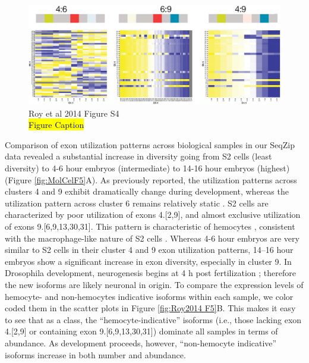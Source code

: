 {		\begin{figure}[htbp] %
		  \centering 
		  \includegraphics{Figures/SeqZipPaper/Roy2014FigS4.eps}
		  \caption[Roy et al 2014 Figure S4]
		  {Roy et al 2014 Figure S4 \\
		    \hl{Figure Caption}
		    }
		  \label{fig:Roy2014 FS4}
		  \end{figure}

		Comparison of exon utilization patterns across biological samples in our SeqZip data revealed a substantial increase in diversity going from S2 cells (least diversity) to 4-6 hour embryos (intermediate) to 14-16 hour embryos (highest) (Figure \ref{fig:MolCelF5}A). As previously reported, the utilization patterns across clusters 4 and 9 exhibit dramatically change during development, whereas the utilization pattern across cluster 6 remains relatively static \citep{Celotto2001,Neves2004,Zhan2004,Sun2013,Miura2013b}. S2 cells are characterized by poor utilization of exons 4.[2,9], and almost exclusive utilization of exons 9.[6,9,13,30,31]. This pattern is characteristic of hemocytes \citep{Watson2005}, consistent with the macrophage-like nature of S2 cells \citep{Schneider1972}. Whereas 4-6 hour embryos are very similar to S2 cells in their cluster 4 and 9 exon utilization patterns, 14–16 hour embryos show a significant increase in exon diversity, especially in cluster 9. In Drosophila development, neurogenesis begins at 
		4 h post fertilization 
		; therefore the new isoforms are likely neuronal in origin.  To compare the expression levels of hemocyte- and non-hemocytes indicative isoforms within each sample, we color coded them in the scatter plots in Figure \ref{fig:Roy2014 F5}B. This makes it easy to see that as a class, the ``hemocyte-indicative'' isoforms (i.e., those lacking exon 4.[2,9] or containing exon 9.[6,9,13,30,31]) dominate all samples in terms of abundance. As development proceeds, however, ``non-hemocyte indicative'' isoforms increase in both number and abundance.

}
